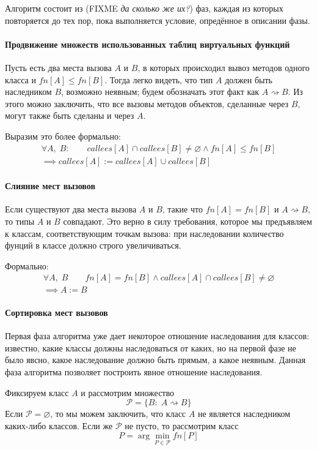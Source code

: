 \documentclass[a4paper,12pt,russian]{article}
\begin{document}
Алгоритм состоит из (FIXME \emph{да сколько же их?}) фаз, каждая из которых повторяется до тех пор, пока выполняется условие, опредённое в описании фазы.

\paragraph{Продвижение множеств использованных таблиц виртуальных функций}
Пусть есть два места вызова $A$ и $B$, в которых происходил вывоз методов одного класса и $fn[A] \leq fn[B]$.
Тогда легко видеть, что тип $A$ должен быть наследником $B$, возможно неявным; будем обозначать этот факт как $A \rightsquigarrow B$.
Из этого можно заключить, что все вызовы методов объектов, сделанные через $B$, могут также быть сделаны и через $A$.

Выразим это более формально:
\begin{eqnarray*}
\forall A,\;B:\qquad callees[A] \cap callees[B] \neq \varnothing \wedge fn[A] \leq fn[B]\\
\implies callees[A] := callees[A] \cup callees[B]
\end{eqnarray*}

\paragraph{Слияние мест вызовов}
Если существуют два места вызова $A$ и $B$, такие что $fn[A] = fn[B]$ и $A \rightsquigarrow B$, то типы $A$ и $B$ совпадают.
Это верно в силу требования, которое мы предъявляем к классам, соответствующим точкам вызова: при наследовании количество фунций в классе должно строго увеличиваться.

Формально:
\begin{eqnarray*}
\forall A,\;B\qquad fn[A] = fn[B] \wedge callees[A] \cap callees[B] \neq \varnothing\\
\implies A := B
\end{eqnarray*}

\paragraph{Сортировка мест вызовов}
Первая фаза алгоритма уже дает некоторое отношение наследования для классов: известно, какие классы должны наследоваться от каких, но на первой фазе не было явсно, какое наследование должно быть прямым, а какое неявным. Данная фаза алгоритма позволяет построить явное отношение наследования.

Фиксируем класс $A$ и рассмотрим множество \[\mathcal{P} = \{B:\; A \rightsquigarrow B\}\]
Если $\mathcal{P} = \varnothing$, то мы можем заключить, что класс $A$ не является наследником каких-либо классов. Если же $\mathcal{P}$ не пусто, то рассмотрим класс \[P = \arg \min_{P \in \mathcal{P}}fn[P]\]
\end{document}
